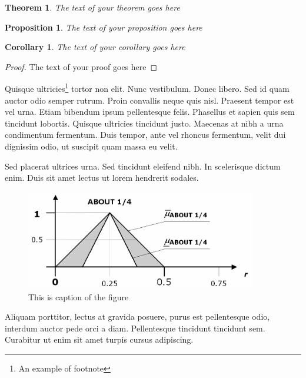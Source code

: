 \documentclass{jacsart}
\newtheorem{theorem}[definition]{Theorem}
\newtheorem{corollary}[definition]{Corollary}
\newtheorem{proposition}[definition]{Proposition}
\begin{document}
\begin{theorem} \label{label-of-theorem}
The text of your theorem goes here
\end{theorem}

\begin{proposition} \label{label-of-proposition}
The text of your proposition goes here
\end{proposition}

\begin{corollary} \label{label-of-corollary}
The text of your corollary goes here
\end{corollary}

\begin{proof} \label{label-of-proof}
The text of your proof goes here
\end{proof}


Quisque ultricies\footnote{An example of footnote} tortor non elit. Nunc vestibulum. Donec libero. Sed id quam
auctor odio semper rutrum. Proin convallis neque quis nisl. Praesent tempor
est vel urna. Etiam bibendum ipsum pellentesque felis. Phasellus et sapien
quis sem tincidunt lobortis. Quisque ultricies tincidunt justo. Maecenas at
nibh a urna condimentum fermentum. Duis tempor, ante vel rhoncus fermentum,
velit dui dignissim odio, ut suscipit quam massa eu velit.

Sed placerat ultrices urna. Sed tincidunt eleifend nibh. In scelerisque dictum
enim. Duis sit amet lectus ut lorem hendrerit sodales. 

\begin{figure}[!t] %
\centering
\includegraphics[width=0.9\textwidth]{5figivfq}
\caption{This is caption of the figure}
\label{label-of-figure-1}
\end{figure}

Aliquam porttitor, lectus at gravida posuere, purus est pellentesque odio,
interdum auctor pede orci a diam. Pellentesque tincidunt tincidunt sem.
Curabitur ut enim sit amet turpis cursus adipiscing. 
\end{document}
